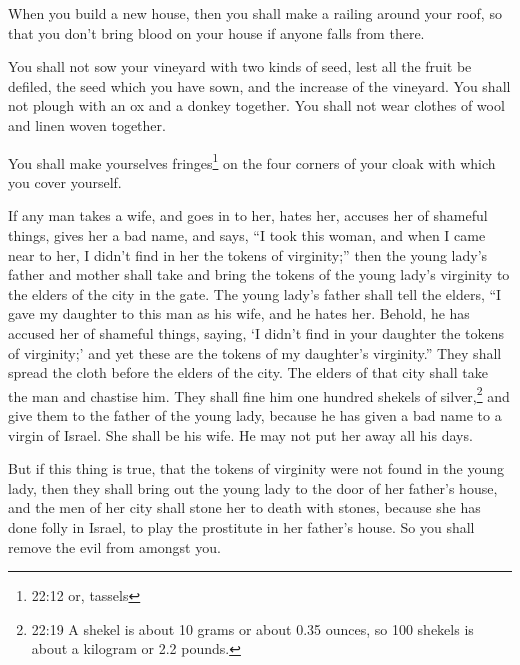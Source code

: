  When you build a new house, then you shall make a railing
around your roof, so that you don't bring blood on your house if anyone
falls from there.

 You shall not sow your vineyard with two kinds of seed,
lest all the fruit be defiled, the seed which you have sown, and the
increase of the vineyard.  You shall not plough with an ox
and a donkey together.  You shall not wear clothes of wool
and linen woven together.

 You shall make yourselves fringes\footnote{22:12 or,
  tassels} on the four corners of your cloak with which you cover
yourself.

 If any man takes a wife, and goes in to her, hates her,
 accuses her of shameful things, gives her a bad name, and
says, ``I took this woman, and when I came near to her, I didn't find in
her the tokens of virginity;''  then the young lady's
father and mother shall take and bring the tokens of the young lady's
virginity to the elders of the city in the gate.  The young
lady's father shall tell the elders, ``I gave my daughter to this man as
his wife, and he hates her.  Behold, he has accused her of
shameful things, saying, `I didn't find in your daughter the tokens of
virginity;' and yet these are the tokens of my daughter's virginity.''
They shall spread the cloth before the elders of the city. 
The elders of that city shall take the man and chastise him.
 They shall fine him one hundred shekels of
silver,\footnote{22:19 A shekel is about 10 grams or about 0.35 ounces,
  so 100 shekels is about a kilogram or 2.2 pounds.} and give them to
the father of the young lady, because he has given a bad name to a
virgin of Israel. She shall be his wife. He may not put her away all his
days.

 But if this thing is true, that the tokens of virginity
were not found in the young lady,  then they shall bring
out the young lady to the door of her father's house, and the men of her
city shall stone her to death with stones, because she has done folly in
Israel, to play the prostitute in her father's house. So you shall
remove the evil from amongst you.

